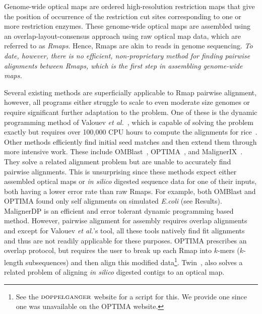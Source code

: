 Genome-wide optical maps are ordered high-resolution restriction maps that give the position of occurrence of the restriction cut sites corresponding to one or more restriction enzymes.  These genome-wide optical maps are assembled using an overlap-layout-consensus approach using  raw optical map data, which are referred to as {\em Rmaps}.  Hence, Rmaps are akin to reads in genome sequencing.  
{\em To date, however, there is no efficient, non-proprietary method for finding pairwise alignments between Rmaps, which is the first step in assembling genome-wide maps.} 

Several existing methods are superficially applicable to Rmap pairwise alignment, however, all programs either struggle to scale to even moderate size genomes or require significant further adaptation to the problem. One of these is the  dynamic programming method of Valouev {\it et al.}~\cite{Valouev06}, which is capable of solving the problem exactly but requires over 100,000 CPU hours to compute the alignments for rice~\cite{valouev2006algorithm}.   Other methods efficiently find initial seed matches and then extend them through more intensive work.  These include OMBlast~\cite{omblast}, OPTIMA~\cite{optima}, and MalignerIX~\cite{maligner}.  They solve a related alignment problem but are unable to accurately find  pairwise alignments.  This is unsurprising since these methods expect either assembled optical maps or \emph{in silico} digested sequence data for one of their inputs, both having a lower error rate than raw Rmaps.  For example, both OMBlast and OPTIMA found only self alignments on simulated {\em E.coli} (see Results).  MalignerDP is an efficient and error tolerant dynamic programming based method.  However, pairwise alignment for assembly requires overlap alignments and except for Valouev {\it et al.}'s tool, all these tools natively find fit alignments and thus are not readily applicable for these purposes.  OPTIMA prescribes an overlap protocol, but requires the user to break up each Rmap into $k$-mers ($k$-length subsequences) and then align this modified data\footnote{See the $\mbox{\rm {\sc doppelganger}}$ website for a script for this. We provide one since one was unavailable on the OPTIMA website.}. Twin~\cite{wabi2014}, also solves a related problem of aligning {\em in silico } digested contigs to an optical map. 
    


